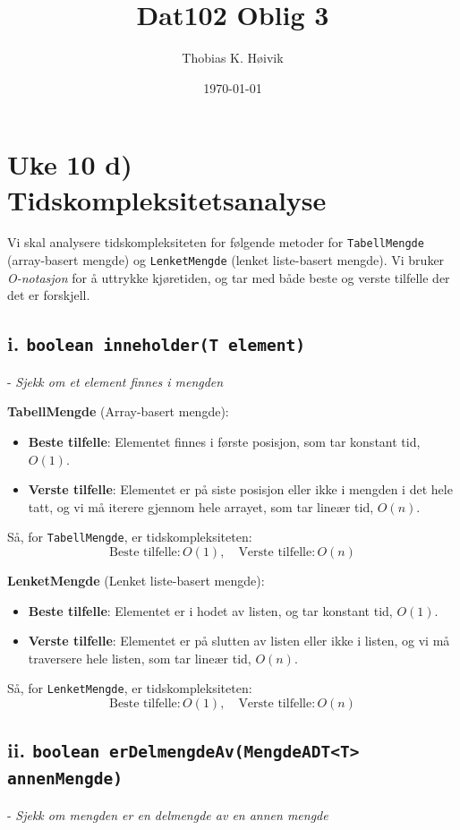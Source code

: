 \documentclass[12pt]{article}
\title{Dat102 Oblig 3}
\author{Thobias K. Høivik} %
\date{\today}
\begin{document}
\maketitle
\section*{Uke 10 d) Tidskompleksitetsanalyse}

Vi skal analysere tidskompleksiteten for følgende metoder for \texttt{TabellMengde} (array-basert mengde) og \texttt{LenketMengde} (lenket liste-basert mengde). Vi bruker \textit{O-notasjon} for å uttrykke kjøretiden, og tar med både beste og verste tilfelle der det er forskjell.

\subsection*{i. \texttt{boolean inneholder(T element)}} - \textit{Sjekk om et element finnes i mengden}

\textbf{TabellMengde} (Array-basert mengde):
\begin{itemize}
    \item \textbf{Beste tilfelle}: Elementet finnes i første posisjon, som tar konstant tid, \(O(1)\).
    \item \textbf{Verste tilfelle}: Elementet er på siste posisjon eller ikke i mengden i det hele tatt, og vi må iterere gjennom hele arrayet, som tar lineær tid, \(O(n)\).
\end{itemize}

Så, for \texttt{TabellMengde}, er tidskompleksiteten:
\[
\text{Beste tilfelle}: O(1), \quad \text{Verste tilfelle}: O(n)
\]

\textbf{LenketMengde} (Lenket liste-basert mengde):
\begin{itemize}
    \item \textbf{Beste tilfelle}: Elementet er i hodet av listen, og tar konstant tid, \(O(1)\).
    \item \textbf{Verste tilfelle}: Elementet er på slutten av listen eller ikke i listen, og vi må traversere hele listen, som tar lineær tid, \(O(n)\).
\end{itemize}

Så, for \texttt{LenketMengde}, er tidskompleksiteten:
\[
\text{Beste tilfelle}: O(1), \quad \text{Verste tilfelle}: O(n)
\]

\subsection*{ii. \texttt{boolean erDelmengdeAv(MengdeADT<T> annenMengde)}} - \textit{Sjekk om mengden er en delmengde av en annen mengde}
\end{document}
